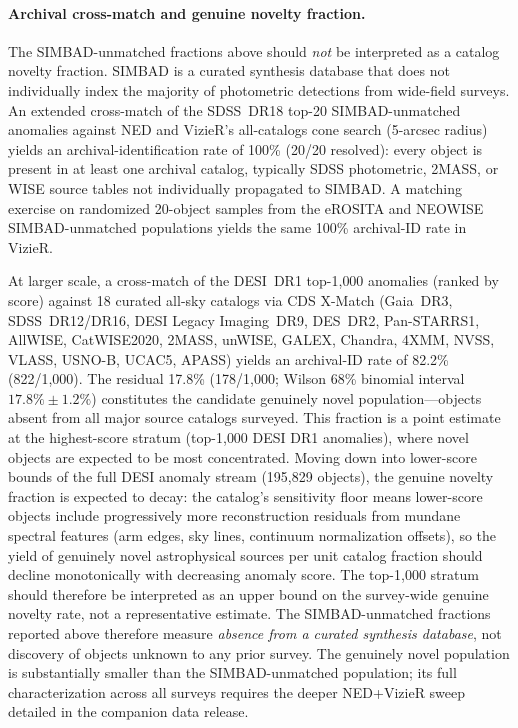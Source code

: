 \documentclass[aps,prd,twocolumn,superscriptaddress,showpacs,preprintnumbers,nofootinbib,longbibliography,floatfix]{revtex4-2}
\begin{document}
\paragraph{Archival cross-match and genuine novelty fraction.}
The SIMBAD-unmatched fractions above should \emph{not} be interpreted as a catalog novelty fraction. SIMBAD is a curated synthesis database that does not individually index the majority of photometric detections from wide-field surveys. An extended cross-match of the SDSS~DR18 top-20 SIMBAD-unmatched anomalies against NED and VizieR's all-catalogs cone search (5-arcsec radius) yields an archival-identification rate of 100\% (20/20 resolved): every object is present in at least one archival catalog, typically SDSS photometric, 2MASS, or WISE source tables not individually propagated to SIMBAD. A matching exercise on randomized 20-object samples from the eROSITA and NEOWISE SIMBAD-unmatched populations yields the same 100\% archival-ID rate in VizieR.

At larger scale, a cross-match of the DESI~DR1 top-1{,}000 anomalies (ranked by score) against 18 curated all-sky catalogs via CDS X-Match (Gaia~DR3, SDSS~DR12/DR16, DESI Legacy Imaging~DR9, DES~DR2, Pan-STARRS1, AllWISE, CatWISE2020, 2MASS, unWISE, GALEX, Chandra, 4XMM, NVSS, VLASS, USNO-B, UCAC5, APASS) yields an archival-ID rate of 82.2\% (822/1{,}000). The residual 17.8\% (178/1{,}000; Wilson 68\% binomial interval $17.8\% \pm 1.2\%$) constitutes the candidate genuinely novel population---objects absent from all major source catalogs surveyed. This fraction is a point estimate at the highest-score stratum (top-1{,}000 DESI DR1 anomalies), where novel objects are expected to be most concentrated. Moving down into lower-score bounds of the full DESI anomaly stream (195{,}829 objects), the genuine novelty fraction is expected to decay: the catalog's sensitivity floor means lower-score objects include progressively more reconstruction residuals from mundane spectral features (arm edges, sky lines, continuum normalization offsets), so the yield of genuinely novel astrophysical sources per unit catalog fraction should decline monotonically with decreasing anomaly score. The top-1{,}000 stratum should therefore be interpreted as an upper bound on the survey-wide genuine novelty rate, not a representative estimate. The SIMBAD-unmatched fractions reported above therefore measure \emph{absence from a curated synthesis database}, not discovery of objects unknown to any prior survey. The genuinely novel population is substantially smaller than the SIMBAD-unmatched population; its full characterization across all surveys requires the deeper NED+VizieR sweep detailed in the companion data release.
\end{document}

